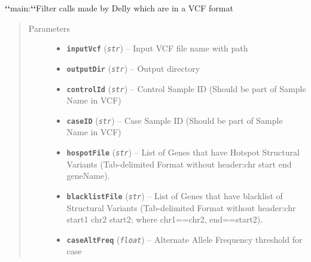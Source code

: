 \documentclass[letterpaper,10pt,english]{sphinxmanual}
\begin{document}
\begin{fulllineitems}
\label{iCallSV:iCallSV.FilterDellyCalls.run}
{\color{red}\bfseries{}{}`{}`}main:{\color{red}\bfseries{}{}`{}`}Filter calls made by Delly which are in a VCF format
\begin{quote}\begin{description}
\item[{Parameters}] \leavevmode\begin{itemize}
\item {} 
\textbf{\texttt{inputVcf}} (\emph{\texttt{str}}) -- Input VCF file name with path

\item {} 
\textbf{\texttt{outputDir}} (\emph{\texttt{str}}) -- Output directory

\item {} 
\textbf{\texttt{controlId}} (\emph{\texttt{str}}) -- Control Sample ID (Should be part of Sample Name in VCF)

\item {} 
\textbf{\texttt{caseID}} (\emph{\texttt{str}}) -- Case Sample ID (Should be part of Sample Name in VCF)

\item {} 
\textbf{\texttt{hospotFile}} (\emph{\texttt{str}}) -- List of Genes that have Hotspot Structural Variants (Tab-delimited Format without header:chr    start    end    geneName).

\item {} 
\textbf{\texttt{blacklistFile}} (\emph{\texttt{str}}) -- List of Genes that have blacklist of Structural Variants (Tab-delimited Format without header:chr    start1    chr2     start2; where chr1==chr2, end==start2).

\item {} 
\textbf{\texttt{caseAltFreq}} (\emph{\texttt{float}}) -- Alternate Allele Frequency threshold for case


\end{itemize}
\end{description}
\end{quote}
\end{fulllineitems}
\end{document}
